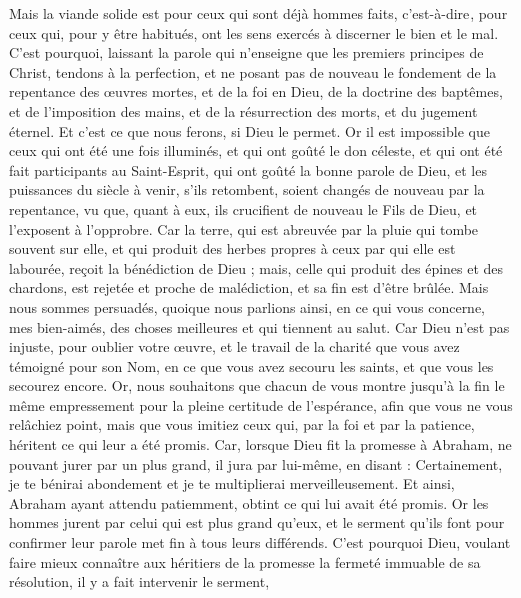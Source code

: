 \begin{multicols}{2}
Mais la viande solide est pour ceux qui sont déjà hommes faits, {c'est-à-dire }, pour ceux qui, pour y être habitués, ont les sens exercés à discerner le bien et le mal.
\VerseOne{}C'est pourquoi, laissant la parole qui n'enseigne que les premiers principes de Christ, tendons à la perfection, et ne posant pas de nouveau le fondement de la repentance des œuvres mortes, et de la foi en Dieu,
de la doctrine des baptêmes, et de l'imposition des mains, et de la résurrection des morts, et du jugement éternel.
Et c'est ce que nous ferons, si Dieu le permet.
Or il est impossible que ceux qui ont été une fois illuminés, et qui ont goûté le don céleste, et qui ont été fait participants au Saint-Esprit,
qui ont goûté la bonne parole de Dieu, et les puissances du siècle à venir,
s'ils retombent, soient changés de nouveau par la repentance, vu que, quant à eux, ils crucifient de nouveau le Fils de Dieu, et l'exposent à l'opprobre.
Car la terre, qui est abreuvée par la pluie qui tombe souvent sur elle, et qui produit des herbes propres à ceux par qui elle est labourée, reçoit la bénédiction de Dieu ;
mais, celle qui produit des épines et des chardons, est rejetée et proche de malédiction, et sa fin est d'être brûlée.
Mais nous sommes persuadés, quoique nous parlions ainsi, en ce qui vous concerne, mes bien-aimés, des choses meilleures et qui tiennent au salut.
Car Dieu n'est pas injuste, pour oublier votre œuvre, et le travail de la charité que vous avez témoigné pour son Nom, en ce que vous avez secouru les saints, et que vous les secourez encore.
Or, nous souhaitons que chacun de vous montre jusqu'à la fin le même empressement pour la pleine certitude de l'espérance,
afin que vous ne vous relâchiez point, mais que vous imitiez ceux qui, par la foi et par la patience, héritent ce qui leur a été promis.
Car, lorsque Dieu fit la promesse à Abraham, ne pouvant jurer par un plus grand, il jura par lui-même,
en disant : Certainement, je te bénirai abondement et je te multiplierai merveilleusement.
Et ainsi, Abraham ayant attendu patiemment, obtint ce qui lui avait été promis.
Or les hommes jurent par celui qui est plus grand qu'eux, et le serment qu'ils font pour confirmer leur parole met fin à tous leurs différends.
C'est pourquoi Dieu, voulant faire mieux connaître aux héritiers de la promesse la fermeté immuable de sa résolution, il y a fait intervenir le serment,

\end{multicols}
